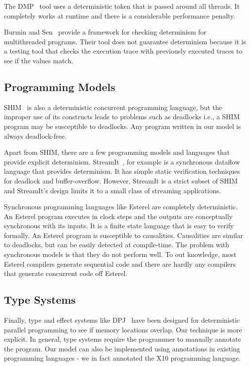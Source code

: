 \documentclass[10pt, conference, compsocconf]{IEEEtran}
\begin{document}
The DMP~\cite{devietti2009dmp} tool uses a deterministic token that is passed around all threads.  It completely works at runtime and there is a considerable performance penalty. 
 
Burmin and Sen~\cite{Burnim2009asserting} provide a framework for checking determinism for 
multithreaded programs. Their tool does not  
 guarantee determinism because it is a testing tool 
that checks the execution trace  with previously executed 
traces to see if the values match. 

\subsection{Programming Models} 
 
SHIM~\cite{edwards2005shim2,tardieu2006scheduling-independent} is also
a deterministic concurrent programming language, but the improper use
of its constructs leads to problems such as deadlocks i.e., a SHIM program
may be susceptible to deadlocks. Any program written in our model is always
deadlock-free.
 
Apart from SHIM, there are  a few programming models and languages 
that provide explicit determinism. StreamIt~\cite{thies2001streamit}, for 
example is a synchronous dataflow language that provides determinism. It 
has simple static verification techniques for deadlock and buffer-overflow. 
However, StreamIt is a strict subset of SHIM and StreamIt's design 
limits it to a small class of streaming applications. 
 
Synchronous programming languages like Esterel are completely deterministic. An Esterel program 
executes in clock steps and the outputs are conceptually synchronous with its inputs. 
It is a finite state language that is easy to verify formally. An Esterel program is susceptible 
to causalities. Causalities are similar to deadlocks, but can be easily detected at compile-time. 
The problem with synchronous models is that they do not perform well. To out knowledge, 
most Esterel compilers generate sequential code and there are hardly any compilers that generate 
concurrent code off Esterel. 
 
\subsection{Type Systems} 
 
Finally, type and effect systems like DPJ~\cite{bocchino2009type} 
 have been designed for deterministic parallel programming to see if
memory locations overlap. Our technique is more explicit. 
In general, type systems require the programmer to manually annotate the program. Our model can also be implemented using annotations in existing
programming languages - we in fact annotated the X10 programming language.
 
\end{document}
